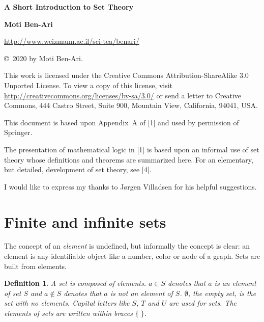 \documentclass[12pt,a4paper]{article}
\newtheorem{definition}[theorem]{Definition}
\begin{document}
\thispagestyle{empty}

\begin{center}
\textbf{\Large A Short Introduction to Set Theory}

\bigskip

\textbf{\Large Moti Ben-Ari}

\bigskip

\url{http://www.weizmann.ac.il/sci-tea/benari/}


\bigskip

\begin{footnotesize}
\copyright{}\ 2020 by Moti Ben-Ari.
\end{footnotesize}
\end{center}

\vspace{-2ex}

\begin{footnotesize}
This work is licensed under the Creative Commons Attribution-ShareAlike 3.0 Unported License. To view a copy of this license, visit \url{http://creativecommons.org/licenses/by-sa/3.0/} or send a letter to Creative Commons, 444 Castro Street, Suite 900, Mountain View, California, 94041, USA.
\end{footnotesize}
\bigskip

\tableofcontents

\newpage

This document is based upon Appendix~A of [1] and used by permission of Springer.

The presentation of mathematical logic in [1] is based upon an informal use of set theory whose definitions and theorems are summarized here. For an elementary, but detailed, development of set theory, see [4].

I would like to express my thanks to J\o{}rgen Villadsen for his helpful suggestions.	

\section{Finite and infinite sets}

The concept of an \emph{element} is undefined, but informally the
concept is clear: an element is any identifiable object like a number,
color or node of a graph. Sets are built from elements.

\begin{definition}
A \emph{set} is composed of
\emph{elements}. $a\in S$ denotes
that $a$ is an element of set $S$ and $a\not\in S$ denotes that $a$ is \emph{not} an element of $S$. $\emptyset$,  the \emph{empty set}, is the set with no
elements. Capital letters like $S$, $T$ and $U$
are used for sets. The elements of sets are written within braces $\{\;\}$.
\end{definition}
\end{document}
